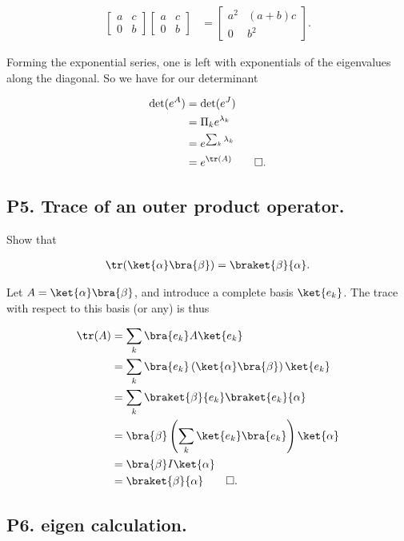 \begin{align*}
\begin{bmatrix}
a & c \\
0 & b
\end{bmatrix}
\begin{bmatrix}
a & c \\
0 & b
\end{bmatrix}
&=
\begin{bmatrix}
a^2 & (a + b)c \\
0 & b^2
\end{bmatrix}.
\end{align*}

Forming the exponential series, one is left with exponentials of the eigenvalues along the diagonal.  So we have for our determinant

\begin{align*}
\det(e^A) 
&=
\det(e^J) \\
&=
\Pi_k e^{\lambda_k} \\
&=
e^{\sum_k \lambda_k} \\
&=
e^{\tr(A)} \qquad \square.
\end{align*}

\subsection{P5. Trace of an outer product operator.}

Show that 

\begin{align*}
\tr( \ket{\alpha}\bra{\beta} ) = \braket{\beta}{\alpha}.
\end{align*}

Let $A = \ket{\alpha}\bra{\beta}$, and introduce a complete basis $\ket{e_k}$.  The trace with respect to this basis (or any) is thus

\begin{align*}
\tr(A) 
&= \sum_k \bra{e_k} A \ket{e_k} \\
&= \sum_k \bra{e_k} \left( \ket{\alpha} \bra{\beta} \right) \ket{e_k} \\
&= \sum_k \braket{\beta} {e_k} \braket{e_k} {\alpha} \\
&= \bra{\beta} \left( \sum_k \ket{e_k} \bra{e_k} \right) \ket{\alpha} \\
&= \bra{\beta} I \ket{\alpha} \\
&= \braket{\beta} {\alpha} \qquad \square.
\end{align*}

\subsection{P6. eigen calculation.}

